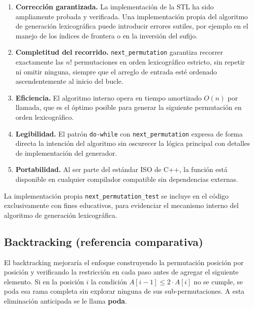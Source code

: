 \documentclass[12pt, a4paper]{article}
\begin{document}
\begin{enumerate}
  \item \textbf{Corrección garantizada.} La implementación de la STL ha sido
        ampliamente probada y verificada. Una implementación propia del algoritmo de
        generación lexicográfica puede introducir errores sutiles, por ejemplo en el
        manejo de los índices de frontera o en la inversión del sufijo.

  \item \textbf{Completitud del recorrido.} \texttt{next\_permutation} garantiza
        recorrer exactamente las $n!$ permutaciones en orden lexicográfico estricto,
        sin repetir ni omitir ninguna, siempre que el arreglo de entrada esté ordenado
        ascendentemente al inicio del bucle.

  \item \textbf{Eficiencia.} El algoritmo interno opera en tiempo amortizado $O(n)$
        por llamada, que es el óptimo posible para generar la siguiente permutación en
        orden lexicográfico.

  \item \textbf{Legibilidad.} El patrón \texttt{do-while} con \texttt{next\_permutation}
        expresa de forma directa la intención del algoritmo sin oscurecer la lógica
        principal con detalles de implementación del generador.

  \item \textbf{Portabilidad.} Al ser parte del estándar ISO de C++, la función está
        disponible en cualquier compilador compatible sin dependencias externas.
\end{enumerate}

La implementación propia \texttt{next\_permutation\_test} se incluye en el código
exclusivamente con fines educativos, para evidenciar el mecanismo interno del
algoritmo de generación lexicográfica.

\subsection{Backtracking (referencia comparativa)}

El backtracking mejoraría el enfoque construyendo la permutación posición por posición
y verificando la restricción en cada paso antes de agregar el siguiente elemento. Si en
la posición $i$ la condición $A[i-1] \leq 2 \cdot A[i]$ no se cumple, se poda esa rama
completa sin explorar ninguna de sus sub-permutaciones. A esta eliminación anticipada
se le llama \textbf{poda}.
\end{document}
